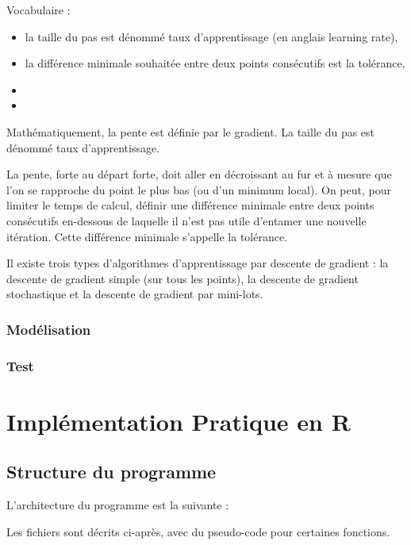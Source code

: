 \documentclass[10pt,french]{report}
\begin{document}
	Vocabulaire :
	\begin{itemize}
		\item la taille du pas est dénommé taux d'apprentissage (en anglais learning rate),
		\item la différence minimale souhaitée entre deux points consécutifs est la tolérance,
		\item 
		\item 
	\end{itemize}
	Mathématiquement, la pente est définie par le gradient. La taille du pas est dénommé taux d'apprentissage.
	
	La pente, forte au départ forte, doit aller en décroissant au fur et à mesure que l'on se rapproche du point le plus bas (ou d'un minimum local). On peut, pour limiter le temps de calcul, définir une différence minimale entre deux points consécutifs en-dessous de laquelle il n'est pas utile d'entamer une nouvelle itération. Cette différence minimale s'appelle la tolérance.
	
	Il existe trois types d'algorithmes d'apprentissage par descente de gradient : la descente de gradient simple (sur tous les points), la descente de gradient stochastique et la descente de gradient par mini-lots.
	
	\subsection{Modélisation}
	
	\subsection{Test}
	
	\chapter{Implémentation Pratique en R}
	
	\section{Structure du programme}
	
	L'architecture du programme est la suivante :
	
	
	Les fichiers sont décrits ci-après, avec du pseudo-code pour certaines fonctions.
	
\end{document}
